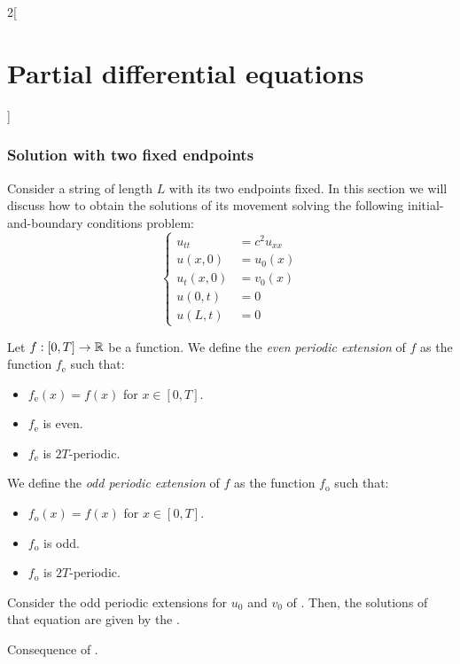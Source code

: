 \documentclass[../../../main_math.tex]{subfiles}
\begin{document}
\begin{multicols}{2}[\section{Partial differential equations}]
  \subsubsection{Solution with two fixed endpoints}
  Consider a string of length $L$ with its two endpoints fixed. In this section we will discuss how to obtain the solutions of its movement solving the following initial-and-boundary conditions problem:
  \begin{equation}\label{PDE:fixedendpoints}
    \left\{
    \begin{aligned}
      u_{tt}   & =c^2u_{xx} \\
      u(x,0)   & =u_0(x)    \\
      u_t(x,0) & =v_0(x)    \\
      u(0,t)   & =0         \\
      u(L,t)   & =0
    \end{aligned}
    \right.
  \end{equation}
  \begin{definition}
    Let $f:[0,T]\rightarrow\mathbb{R}$ be a function. We define the \emph{even periodic extension} of $f$ as the function $f_{\mathrm{e}}$ such that:
    \begin{itemize}
      \item $f_{\mathrm{e}}(x)=f(x)$ for $x\in[0, T]$.
      \item $f_{\mathrm{e}}$ is even.
      \item $f_{\mathrm{e}}$ is $2T$-periodic.
    \end{itemize}
    We define the \emph{odd periodic extension} of $f$ as the function $f_{\mathrm{o}}$ such that:
    \begin{itemize}
      \item $f_{\mathrm{o}}(x)=f(x)$ for $x\in[0, T]$.
      \item $f_{\mathrm{o}}$ is odd.
      \item $f_{\mathrm{o}}$ is $2T$-periodic.
    \end{itemize}
  \end{definition}
  \begin{proposition}
    Consider the odd periodic extensions for $u_0$ and $v_0$ of . Then, the solutions of that equation are given by the .
  \end{proposition}
  \begin{sproof}
    Consequence of .
  \end{sproof}
  \begin{proposition}\label{PDE:methodchar}

\end{proposition}
\end{multicols}
\end{document}

